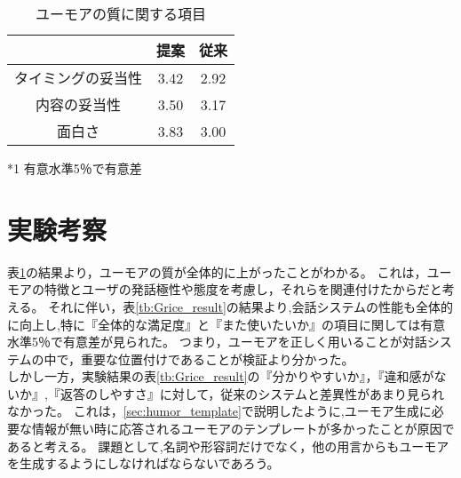 \begin{table}[tb]
\begin{center}
\caption{ユーモアの質に関する項目}
\label{tb:Humor_result}
\begin{tabular}{|c||c|c|}
\hline
 & 提案 & 従来 \\
\hline\hline
タイミングの妥当性 & 3.42  & 2.92  \\
\hline
内容の妥当性 & 3.50  & 3.17  \\
\hline
面白さ & 3.83  & 3.00  \\
\hline
\end{tabular}
\end{center}
\hspace{12zw}*1 有意水準5％で有意差
\end{table}

\section{実験考察}
表\ref{tb:Humor_result}の結果より，ユーモアの質が全体的に上がったことがわかる。
これは，ユーモアの特徴とユーザの発話極性や態度を考慮し，それらを関連付けたからだと考える。
それに伴い，表\ref{tb:Grice_result}の結果より,会話システムの性能も全体的に向上し,特に『全体的な満足度』と『また使いたいか』の項目に関しては有意水準5％で有意差が見られた。
つまり，ユーモアを正しく用いることが対話システムの中で，重要な位置付けであることが検証より分かった。\\
\hspace{1zw}しかし一方，実験結果の表\ref{tb:Grice_result}の『分かりやすいか』，『違和感がないか』,『返答のしやすさ』に対して，従来のシステムと差異性があまり見られなかった。
これは，\ref{sec:humor_template}で説明したように,ユーモア生成に必要な情報が無い時に応答されるユーモアのテンプレートが多かったことが原因であると考える。
課題として,名詞や形容詞だけでなく，他の用言からもユーモアを生成するようにしなければならないであろう。
